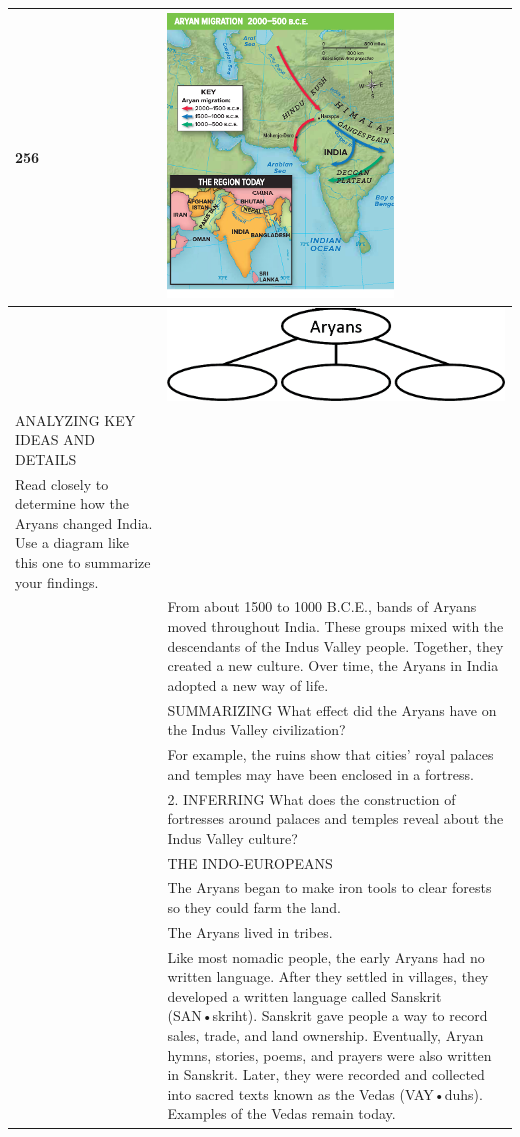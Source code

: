 \begin{longtable}{|>{\raggedleft}p{1.5cm}|p{8.5cm}|}
\vbox{\hbox{}\hbox{256}\hbox{\phantom{\rule{0pt}{4.6cm}}}} & \includegraphics[scale=0.5]{figures/chap4-fig1.png} \tabularnewline
\hline
251 & \centering\includegraphics[scale=0.5]{figures/chap4-fig2.png}\\ \raggedright ANALYZING KEY IDEAS AND DETAILS\\ Read closely to determine how the Aryans changed India. Use a diagram like this one to summarize your findings. \tabularnewline
\hline
255 & From about 1500 to 1000 B.C.E., bands of Aryans moved throughout India. These groups mixed with the descendants of the Indus Valley people. Together, they created a new culture. Over time, the Aryans in India adopted a new way of life. \tabularnewline
\hline
284 & SUMMARIZING What effect did the Aryans have on the Indus Valley civilization? \tabularnewline
\hline
254 & For example, the ruins show that cities’ royal palaces and temples may have been enclosed in a fortress. \tabularnewline
\hline
254 & 2. INFERRING What does the construction of fortresses around palaces and temples reveal about the Indus Valley culture? \tabularnewline
\hline
255 & THE INDO-EUROPEANS \tabularnewline
\hline
255 & The Aryans began to make iron tools to clear forests so they could farm the land. \tabularnewline
\hline
256 & The Aryans lived in tribes. \tabularnewline
\hline
256 & Like most nomadic people, the early Aryans had no written language. After they settled in villages, they developed a written language called Sanskrit (SAN•skriht). Sanskrit gave people a way to record sales, trade, and land ownership. Eventually, Aryan hymns, stories, poems, and prayers were also written in Sanskrit. Later, they were recorded and collected into sacred texts known as the Vedas (VAY•duhs). Examples of the Vedas remain today. \tabularnewline

\end{longtable}
